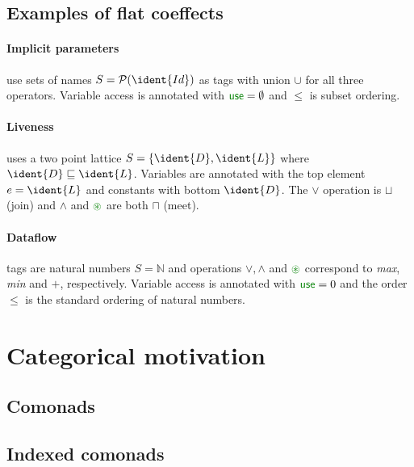 
\subsection{Examples of flat coeffects}

\vspace{-0.4em}
\paragraph{Implicit parameters} use sets of names $S = \mathcal{P}(\ident{Id})$ as tags with
union $\cup$ for all three operators. Variable access is annotated with $\cunit = \emptyset$
and $\leq$ is subset ordering.

\vspace{-0.4em}
\paragraph{Liveness} uses a two point lattice $S=\{ \ident{D}, \ident{L} \}$ where
$\ident{D} \sqsubseteq \ident{L}$. Variables are annotated with the top element $e = \ident{L}$ 
and constants with bottom $\ident{D}$. The $\vee$ operation is $\sqcup$ (join) and $\wedge$
and $\cseq$ are both $\sqcap$ (meet).

\vspace{-0.4em}
\paragraph{Dataflow} tags are natural numbers $S = \mathbb{N}$ and operations
$\vee, \wedge$ and $\cseq$ correspond to \textit{max}, \textit{min} and $+$, respectively. 
Variable access is annotated with $\cunit = 0$ and the order $\leq$ is the standard ordering
of natural numbers.


\section{Categorical motivation}
\label{sec:flat-semantics}

\subsection{Comonads}
\subsection{Indexed comonads}
